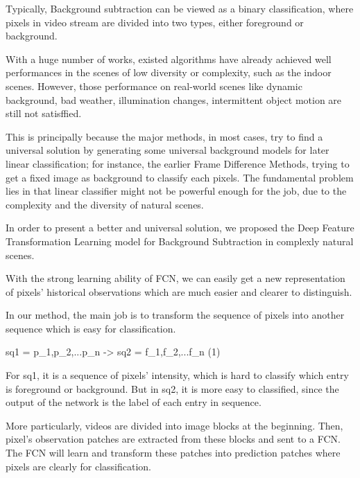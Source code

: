 \documentclass[journal]{IEEEtran}
\begin{document}
Typically, Background subtraction can be viewed as a binary classification, where pixels in video stream are divided into two
types, either foreground or background.

With a huge number of works, existed algorithms have already achieved well performances in the scenes of low diversity or complexity,
such as the indoor scenes. However, those performance on real-world scenes like dynamic background, bad weather, illumination changes,
intermittent object motion are still not satisffied.

This is principally because the major methods, in most cases, try to find a universal solution by generating some universal 
background models for later linear classification; for instance, the earlier Frame Difference Methods, trying to get a fixed 
image as background to classify each pixels. The fundamental problem lies in that linear classifier might not be powerful enough for the job,
due to the complexity and the diversity of natural scenes.

In order to present a better and universal solution, we proposed the Deep Feature Transformation Learning model for Background Subtraction 
in complexly natural scenes.

With the strong learning ability of FCN, we can easily get a new representation of pixels' historical observations which are much easier and clearer to distinguish.

In our method, the main job is to transform the sequence of pixels into another sequence which is easy for classification.

sq1 = {p_1,p_2,...p_n} -> sq2 = {f_1,f_2,...f_n}                     (1)

For sq1, it is a sequence of pixels' intensity, which is hard to classify which entry is foreground or background.
But in sq2, it is more easy to classified, since the output of the network is the label of each entry in sequence.

More particularly, videos are divided into image blocks at the beginning. Then, pixel's observation patches are extracted from these blocks and sent to a FCN.
The FCN will learn and transform these patches into prediction patches where pixels are clearly for classification.
\end{document}
